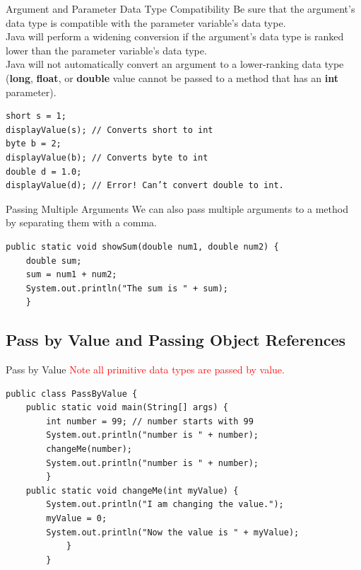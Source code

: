 \documentclass[11pt]{beamer}
\newcommand{\red}[1]{\textcolor{red}{#1}}
\begin{document}
\begin{frame}[fragile]{Argument and Parameter Data Type Compatibility}
    Be sure that the argument’s data type is compatible with the parameter variable’s data type. \\
    \vspace{1em}
    Java will perform a widening conversion if the argument’s data type is ranked lower than the parameter variable’s data type. \\ 
    \vspace{1em}
    Java will not automatically convert an argument to a lower-ranking data type (\textbf{long}, \textbf{float}, or \textbf{double} value cannot be passed to a method that has an \textbf{int} parameter).
\begin{lstlisting}
short s = 1;
displayValue(s); // Converts short to int
byte b = 2;
displayValue(b); // Converts byte to int
double d = 1.0;
displayValue(d); // Error! Can’t convert double to int.
\end{lstlisting}
\end{frame}

\begin{frame}[fragile]{Passing Multiple Arguments}
    We can also pass multiple arguments to a method by separating them with a comma.
    \begin{lstlisting}
public static void showSum(double num1, double num2) { 
    double sum;
    sum = num1 + num2;
    System.out.println("The sum is " + sum);
    }
    \end{lstlisting}
\end{frame}

\subsection{Pass by Value and Passing Object References}
\begin{frame}[fragile]{Pass by Value}
\red{Note all primitive data types are passed by value.}
    \begin{lstlisting}
public class PassByValue {
    public static void main(String[] args) {
        int number = 99; // number starts with 99
        System.out.println("number is " + number);
        changeMe(number);
        System.out.println("number is " + number);
        }
    public static void changeMe(int myValue) {
        System.out.println("I am changing the value.");
        myValue = 0;
        System.out.println("Now the value is " + myValue);
            }
        }        
    \end{lstlisting}
\end{frame}
\end{document}
